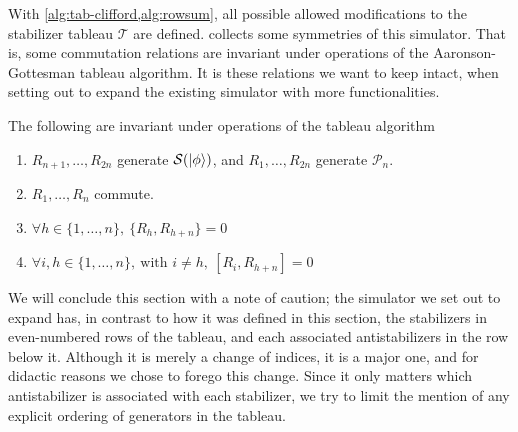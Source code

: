 With \cref{alg:tab-clifford,alg:rowsum}, all possible allowed modifications to
the stabilizer tableau $\mathcal{T}$ are defined.  collects
some symmetries of this simulator. That is, some commutation relations are
invariant under operations of the Aaronson-Gottesman tableau algorithm. It is
these relations we want to keep intact, when setting out to expand the existing
simulator with more functionalities.
\begin{prop}\label{prop:comm-tab}
  The following are invariant under operations of the tableau algorithm
  \begin{enumerate}
    \item $R_{n+1},\ldots,R_{2n}$ generate $\mathcal{S}(\ket{\phi})$, and $R_1, \ldots,
      R_{2n}$ generate $\mathcal{P}_n$.
    \item $R_1, \ldots, R_n$ commute.
    \item $\forall h \in \{1,\ldots,n\}, \ \{R_h, R_{h+n}\} = 0$
    \item $\forall i,h \in \{1,\ldots,n\}, \ \text{with } i\neq h, \ [R_i, R_{h+n}] = 0$
  \end{enumerate}
\end{prop}
We will conclude this section with a note of caution; the simulator we set out
to expand has, in contrast to how it was defined in this section, the
stabilizers in even-numbered rows of the tableau, and each associated
antistabilizers in the row below it. Although it is merely a change of indices,
it is a major one, and for didactic reasons we chose to forego this change.
Since it only matters which antistabilizer is associated with each stabilizer,
we try to limit the mention of any explicit ordering of generators in the
tableau.

%
